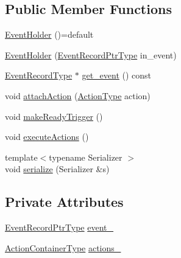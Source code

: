 \subsection*{Public Member Functions}
\begin{DoxyCompactItemize}
\item 
\hyperlink{structvt_1_1event_1_1_event_holder_aba66e34b2e3f90d418430be281ccb9b1}{Event\+Holder} ()=default
\item 
\hyperlink{structvt_1_1event_1_1_event_holder_a11cef5f8c68e7052e0756c0a7506a278}{Event\+Holder} (\hyperlink{structvt_1_1event_1_1_event_holder_a89949c85549018aad229356105187d50}{Event\+Record\+Ptr\+Type} in\+\_\+event)
\item 
\hyperlink{structvt_1_1event_1_1_event_holder_adfdec23d67b016b1f028694d5ca5bcff}{Event\+Record\+Type} $\ast$ \hyperlink{structvt_1_1event_1_1_event_holder_ac679f89c2b133834d0a10181a80c5d47}{get\+\_\+event} () const
\item 
void \hyperlink{structvt_1_1event_1_1_event_holder_aa5563adb9da7193d0a8260424d756c51}{attach\+Action} (\hyperlink{namespacevt_ae0a5a7b18cc99d7b732cb4d44f46b0f3}{Action\+Type} action)
\item 
void \hyperlink{structvt_1_1event_1_1_event_holder_a6a9295755ee849b769c7e5ad1c25ee08}{make\+Ready\+Trigger} ()
\item 
void \hyperlink{structvt_1_1event_1_1_event_holder_a39cab4f8ac00152657fcb2e49497f049}{execute\+Actions} ()
\item 
{\footnotesize template$<$typename Serializer $>$ }\\void \hyperlink{structvt_1_1event_1_1_event_holder_a20420fda8b6b3165386608e62008ba79}{serialize} (Serializer \&s)
\end{DoxyCompactItemize}
\subsection*{Private Attributes}
\begin{DoxyCompactItemize}
\item 
\hyperlink{structvt_1_1event_1_1_event_holder_a89949c85549018aad229356105187d50}{Event\+Record\+Ptr\+Type} \hyperlink{structvt_1_1event_1_1_event_holder_a62cebec55c3a8a4a54423d11504fb4ea}{event\+\_\+}
\item 
\hyperlink{structvt_1_1event_1_1_event_holder_ae0e2d5fe3bd5792118116105a0a09db7}{Action\+Container\+Type} \hyperlink{structvt_1_1event_1_1_event_holder_ab2badf41e04556c851639ea432768560}{actions\+\_\+}
\end{DoxyCompactItemize}


